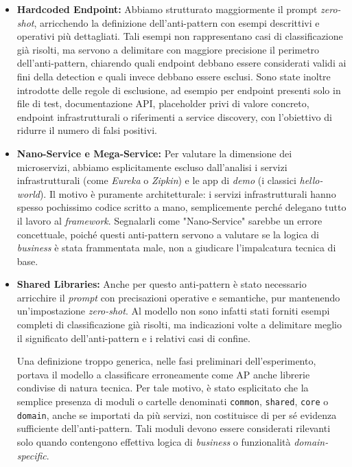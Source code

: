 \begin{itemize}
    \item \textbf{Hardcoded Endpoint:} Abbiamo strutturato maggiormente il prompt \textit{zero-shot}, arricchendo la definizione dell'anti-pattern con esempi descrittivi e operativi più dettagliati. Tali esempi non rappresentano casi di classificazione già risolti, ma servono a delimitare con maggiore precisione il perimetro dell'anti-pattern, chiarendo quali endpoint debbano essere considerati validi ai fini della detection e quali invece debbano essere esclusi. Sono state inoltre introdotte delle regole di esclusione, ad esempio per endpoint presenti solo in file di test, documentazione API, placeholder privi di valore concreto, endpoint infrastrutturali o riferimenti a service discovery, con l'obiettivo di ridurre il numero di falsi positivi.
    
    \item \textbf{Nano-Service e Mega-Service:} Per valutare la dimensione dei microservizi, abbiamo esplicitamente escluso dall'analisi i servizi infrastrutturali (come \textit{Eureka} o \textit{Zipkin}) e le app di \textit{demo} (i classici \textit{hello-world}). Il motivo è puramente architetturale: i servizi infrastrutturali hanno spesso pochissimo codice scritto a mano, semplicemente perché delegano tutto il lavoro al \textit{framework}. Segnalarli come "Nano-Service" sarebbe un errore concettuale, poiché questi anti-pattern servono a valutare se la logica di \textit{business} è stata frammentata male, non a giudicare l'impalcatura tecnica di base.

    \item \textbf{Shared Libraries:} Anche per questo anti-pattern è stato necessario arricchire il \textit{prompt} con precisazioni operative e semantiche, pur mantenendo un'impostazione \textit{zero-shot}. Al modello non sono infatti stati forniti esempi completi di classificazione già risolti, ma indicazioni volte a delimitare meglio il significato dell'anti-pattern e i relativi casi di confine.

    Una definizione troppo generica, nelle fasi preliminari dell'esperimento, portava il modello a classificare erroneamente come AP anche librerie condivise di natura tecnica. Per tale motivo, è stato esplicitato che la semplice presenza di moduli o cartelle denominati \texttt{common}, \texttt{shared}, \texttt{core} o \texttt{domain}, anche se importati da più servizi, non costituisce di per sé evidenza sufficiente dell'anti-pattern. Tali moduli devono essere considerati rilevanti solo quando contengono effettiva logica di \textit{business} o funzionalità \textit{domain-specific}.

    
\end{itemize}


